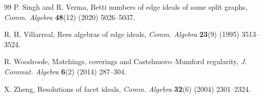 \documentclass[12pt]{article}
\theoremstyle{definition}
\theoremstyle{remark}
\begin{document}
\begin{thebibliography}{99}
		P. Singh and R. Verma, Betti numbers of edge ideals of some split graphs, \emph{Comm. Algebra} \textbf{48}(12) (2020) 5026--5037.
		
		R. H. Villarreal, Rees algebras of edge ideals, \emph{Comm. Algebra} \textbf{23}(9) (1995) 3513--3524.
		
		R. Woodroofe, Matchings, coverings and Castelnuovo--Mumford regularity, \emph{J. Commut. Algebra} \textbf{6}(2) (2014) 287--304.
		
		X. Zheng, Resolutions of facet ideals, \emph{Comm. Algebra} \textbf{32}(6) (2004) 2301--2324.
		
	\end{thebibliography}
	
\end{document}
